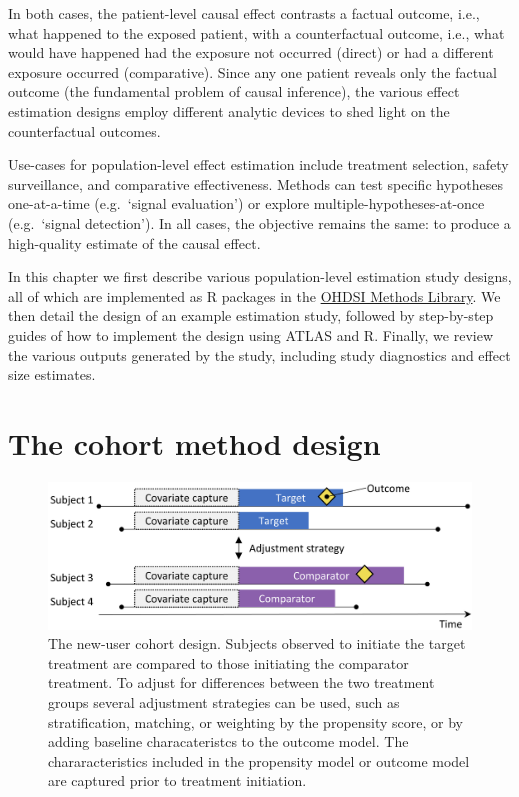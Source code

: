 \documentclass[11pt]{book}
\theoremstyle{definition}
\theoremstyle{definition}
\theoremstyle{definition}
\theoremstyle{remark}
\begin{document}
In both cases, the patient-level causal effect contrasts a factual outcome, i.e., what happened to the exposed patient, with a counterfactual outcome, i.e., what would have happened had the exposure not occurred (direct) or had a different exposure occurred (comparative). Since any one patient reveals only the factual outcome (the fundamental problem of causal inference), the various effect estimation designs employ different analytic devices to shed light on the counterfactual outcomes.

Use-cases for population-level effect estimation include treatment selection, safety surveillance, and comparative effectiveness. Methods can test specific hypotheses one-at-a-time (e.g.~`signal evaluation') or explore multiple-hypotheses-at-once (e.g.~`signal detection'). In all cases, the objective remains the same: to produce a high-quality estimate of the causal effect.

In this chapter we first describe various population-level estimation study designs, all of which are implemented as R packages in the \href{https://ohdsi.github.io/MethodsLibrary/}{OHDSI Methods Library}. We then detail the design of an example estimation study, followed by step-by-step guides of how to implement the design using ATLAS and R. Finally, we review the various outputs generated by the study, including study diagnostics and effect size estimates.

\hypertarget{CohortMethod}{%
\section{The cohort method design}\label{CohortMethod}}


\begin{figure}

{\centering \includegraphics[width=0.9\linewidth]{images/PopulationLevelEstimation/cohortMethod} 

}

\caption{The new-user cohort design. Subjects observed to initiate the target treatment are compared to those initiating the comparator treatment. To adjust for differences between the two treatment groups several adjustment strategies can be used, such as stratification, matching, or weighting by the propensity score, or by adding baseline characateristcs to the outcome model. The chararacteristics included in the propensity model or outcome model are captured prior to treatment initiation.}\label{fig:cohortMethod}
\end{figure}
\end{document}
